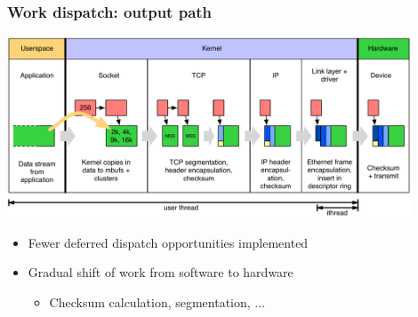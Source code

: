 \begin{frame}
  \frametitle{Work dispatch: output path}

  \begin{center}
    \includegraphics[width=0.9\textwidth]{../../figures/network-dispatch-output.pdf}
  \end{center}

  \pause

  \begin{itemize}
    \item Fewer deferred dispatch opportunities implemented

    \pause

    \item Gradual shift of work from software to hardware
    \begin{itemize}
      \item Checksum calculation, segmentation, ...
    \end{itemize}
  \end{itemize}

\end{frame}

